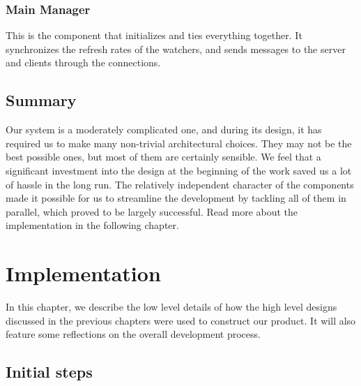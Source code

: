 \documentclass{l3proj}
\begin{document}
\subsection{Main Manager}
This is the component that initializes and ties everything together. It synchronizes the refresh rates of the watchers, and sends messages to the server and clients through the connections.


\section{Summary}

Our system is a moderately complicated one, and during its design, it has required us to make many non-trivial architectural choices. They may not be the best possible ones, but most of them are certainly sensible. We feel that a significant investment into the design at the beginning of the work saved us a lot of hassle in the long run. The relatively independent character of the components made it possible for us to streamline the development by tackling all of them in parallel, which proved to be largely successful. Read more about the implementation in the following chapter.



\chapter{Implementation}
\label{impl}

In this chapter, we describe the low level details of how the high level designs discussed in the previous chapters were used to construct our product. It will also feature some reflections on the overall development process.


\section{Initial steps}
\end{document}
